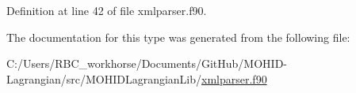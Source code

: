 Definition at line 42 of file xmlparser.\+f90.



The documentation for this type was generated from the following file\+:\begin{DoxyCompactItemize}
\item 
C\+:/\+Users/\+R\+B\+C\+\_\+workhorse/\+Documents/\+Git\+Hub/\+M\+O\+H\+I\+D-\/\+Lagrangian/src/\+M\+O\+H\+I\+D\+Lagrangian\+Lib/\mbox{\hyperlink{xmlparser_8f90}{xmlparser.\+f90}}\end{DoxyCompactItemize}

